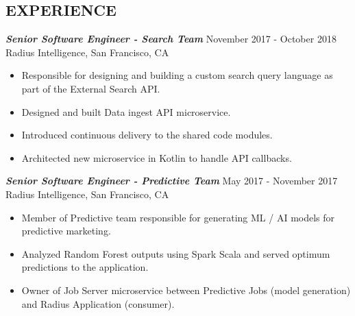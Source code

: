 \documentclass[overlapped, 10pt]{res} %
\begin{document}
\begin{resume}

 


 
\section{EXPERIENCE}\smallskip

{\sl \textbf{Senior Software Engineer - Search Team}} \hfill November 2017 - October 2018 \\
Radius Intelligence, San Francisco, CA
\begin{itemize}
\item Responsible for designing and building a custom search query language as part of the External Search API.
\item Designed and built Data ingest API microservice.
\item Introduced continuous delivery to the shared code modules.
\item Architected new microservice in Kotlin to handle API callbacks.
\end{itemize} 

{\sl \textbf{Senior Software Engineer - Predictive Team}} \hfill May 2017 - November 2017 \\
Radius Intelligence, San Francisco, CA
\begin{itemize}
\item Member of Predictive team responsible for generating ML / AI models for predictive marketing.
\item Analyzed Random Forest outputs using Spark Scala and served optimum predictions to the application.
\item Owner of Job Server microservice between Predictive Jobs (model generation) and Radius Application (consumer).
\end{itemize} 


\end{resume}
\end{document}
